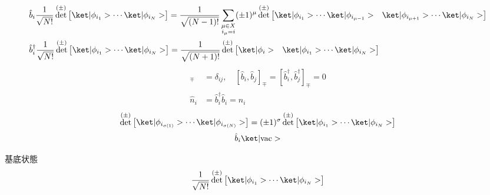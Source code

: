 \documentclass[uplatex,dvipdfmx,a4paper,11pt]{jlreq}
\DeclareMathOperator{\Det}{det}
\numberwithin{equation}{section}
\theoremstyle{definition}
\begin{document}
\begin{theorem}
  \begin{align*}
     & \hat{b}_i\frac{1}{\sqrt{N!}}\Det^{(\pm)}\begin{bmatrix}\ket|\phi_{i_1}> \cdots \ket|\phi_{i_N}>\end{bmatrix} = \frac{1}{\sqrt{(N-1)!}}\sum_{\substack{\mu\in X                                                                                \\ i_\mu = i}}(\pm1)^\mu\Det^{(\pm)}\begin{bmatrix}\ket|\phi_{i_1}> \cdots \ket|\phi_{i_{\mu-1}}> & \ket|\phi_{i_{\mu+1}}>\cdots\ket|\phi_{i_N}>\end{bmatrix} \\
     & \hat{b}_i^\dagger\frac{1}{\sqrt{N!}}\Det^{(\pm)}\begin{bmatrix}\ket|\phi_{i_1}> \cdots \ket|\phi_{i_N}>\end{bmatrix} = \frac{1}{\sqrt{(N+1)!}}\Det^{(\pm)}\begin{bmatrix}\ket|\phi_i> & \ket|\phi_{i_1}> \cdots \ket|\phi_{i_N}>\end{bmatrix}
  \end{align*}
  \begin{align}
    [\hat{b}_i, \hat{b}_j^\dagger]_\mp & = \delta_{ij}, \quad [\hat{b}_i, \hat{b}_j]_\mp = [\hat{b}_i^\dagger, \hat{b}_j^\dagger]_\mp = 0 \\
    \hat{n}_i                          & = \hat{b}_i^\dagger\hat{b}_i = n_i
  \end{align}
  \begin{align}
    \Det^{(\pm)}\begin{bmatrix}\ket|\phi_{i_{\sigma(1)}}> \cdots \ket|\phi_{i_{\sigma(N)}}>\end{bmatrix} = (\pm 1)^\sigma\Det^{(\pm)}\begin{bmatrix}\ket|\phi_{i_1}> \cdots \ket|\phi_{i_N}>\end{bmatrix}
  \end{align}
  \begin{align}
    \hat{b}_i\ket|\mathrm{vac}>
  \end{align}
\end{theorem}

基底状態
\begin{align}
  \frac{1}{\sqrt{N!}}\Det^{(\pm)}\begin{bmatrix}\ket|\phi_{i_1}>\cdots\ket|\phi_{i_N}>\end{bmatrix}
\end{align}
\end{document}
